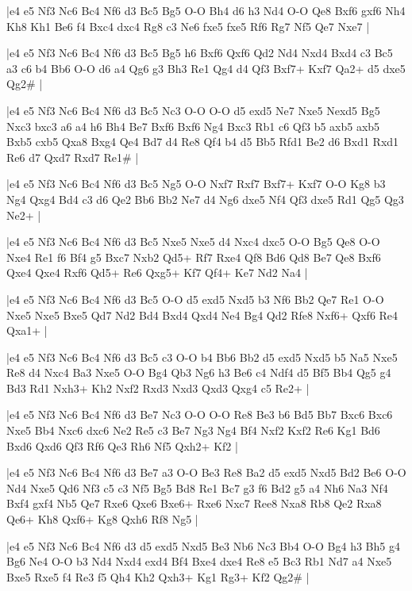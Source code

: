 \whitename{}
\blackname{}
\makegametitle
|e4 e5 Nf3 Nc6 Bc4 Nf6 d3 Bc5 Bg5 O-O Bh4 d6 h3 Nd4 O-O Qe8 Bxf6 gxf6 Nh4 Kh8 Kh1 Be6 f4 Bxc4 dxc4 Rg8 c3 Ne6 fxe5 fxe5 Rf6 Rg7 Nf5 Qe7 Nxe7  |

\whitename{}
\blackname{}
\makegametitle
|e4 e5 Nf3 Nc6 Bc4 Nf6 d3 Bc5 Bg5 h6 Bxf6 Qxf6 Qd2 Nd4 Nxd4 Bxd4 c3 Bc5 a3 c6 b4 Bb6 O-O d6 a4 Qg6 g3 Bh3 Re1 Qg4 d4 Qf3 Bxf7+ Kxf7 Qa2+ d5 dxe5 Qg2\#  |

\whitename{}
\blackname{}
\makegametitle
|e4 e5 Nf3 Nc6 Bc4 Nf6 d3 Bc5 Nc3 O-O O-O d5 exd5 Ne7 Nxe5 Nexd5 Bg5 Nxc3 bxc3 a6 a4 h6 Bh4 Be7 Bxf6 Bxf6 Ng4 Bxc3 Rb1 c6 Qf3 b5 axb5 axb5 Bxb5 cxb5 Qxa8 Bxg4 Qe4 Bd7 d4 Re8 Qf4 b4 d5 Bb5 Rfd1 Be2 d6 Bxd1 Rxd1 Re6 d7 Qxd7 Rxd7 Re1\#  |

\whitename{}
\blackname{}
\makegametitle
|e4 e5 Nf3 Nc6 Bc4 Nf6 d3 Bc5 Ng5 O-O Nxf7 Rxf7 Bxf7+ Kxf7 O-O Kg8 b3 Ng4 Qxg4 Bd4 c3 d6 Qe2 Bb6 Bb2 Ne7 d4 Ng6 dxe5 Nf4 Qf3 dxe5 Rd1 Qg5 Qg3 Ne2+  |

\whitename{}
\blackname{}
\makegametitle
|e4 e5 Nf3 Nc6 Bc4 Nf6 d3 Bc5 Nxe5 Nxe5 d4 Nxc4 dxc5 O-O Bg5 Qe8 O-O Nxe4 Re1 f6 Bf4 g5 Bxc7 Nxb2 Qd5+ Rf7 Rxe4 Qf8 Bd6 Qd8 Be7 Qe8 Bxf6 Qxe4 Qxe4 Rxf6 Qd5+ Re6 Qxg5+ Kf7 Qf4+ Ke7 Nd2 Na4  |

\whitename{}
\blackname{}
\makegametitle
|e4 e5 Nf3 Nc6 Bc4 Nf6 d3 Bc5 O-O d5 exd5 Nxd5 b3 Nf6 Bb2 Qe7 Re1 O-O Nxe5 Nxe5 Bxe5 Qd7 Nd2 Bd4 Bxd4 Qxd4 Ne4 Bg4 Qd2 Rfe8 Nxf6+ Qxf6 Re4 Qxa1+  |

\whitename{}
\blackname{}
\makegametitle
|e4 e5 Nf3 Nc6 Bc4 Nf6 d3 Bc5 c3 O-O b4 Bb6 Bb2 d5 exd5 Nxd5 b5 Na5 Nxe5 Re8 d4 Nxc4 Ba3 Nxe5 O-O Bg4 Qb3 Ng6 h3 Be6 c4 Ndf4 d5 Bf5 Bb4 Qg5 g4 Bd3 Rd1 Nxh3+ Kh2 Nxf2 Rxd3 Nxd3 Qxd3 Qxg4 c5 Re2+  |

\whitename{}
\blackname{}
\makegametitle
|e4 e5 Nf3 Nc6 Bc4 Nf6 d3 Be7 Nc3 O-O O-O Re8 Be3 b6 Bd5 Bb7 Bxc6 Bxc6 Nxe5 Bb4 Nxc6 dxc6 Ne2 Re5 c3 Be7 Ng3 Ng4 Bf4 Nxf2 Kxf2 Re6 Kg1 Bd6 Bxd6 Qxd6 Qf3 Rf6 Qe3 Rh6 Nf5 Qxh2+ Kf2  |

\whitename{}
\blackname{}
\makegametitle
|e4 e5 Nf3 Nc6 Bc4 Nf6 d3 Be7 a3 O-O Be3 Re8 Ba2 d5 exd5 Nxd5 Bd2 Be6 O-O Nd4 Nxe5 Qd6 Nf3 c5 c3 Nf5 Bg5 Bd8 Re1 Bc7 g3 f6 Bd2 g5 a4 Nh6 Na3 Nf4 Bxf4 gxf4 Nb5 Qe7 Rxe6 Qxe6 Bxe6+ Rxe6 Nxc7 Ree8 Nxa8 Rb8 Qe2 Rxa8 Qe6+ Kh8 Qxf6+ Kg8 Qxh6 Rf8 Ng5  |

\whitename{}
\blackname{}
\makegametitle
|e4 e5 Nf3 Nc6 Bc4 Nf6 d3 d5 exd5 Nxd5 Be3 Nb6 Nc3 Bb4 O-O Bg4 h3 Bh5 g4 Bg6 Ne4 O-O b3 Nd4 Nxd4 exd4 Bf4 Bxe4 dxe4 Re8 e5 Bc3 Rb1 Nd7 a4 Nxe5 Bxe5 Rxe5 f4 Re3 f5 Qh4 Kh2 Qxh3+ Kg1 Rg3+ Kf2 Qg2\#  |


